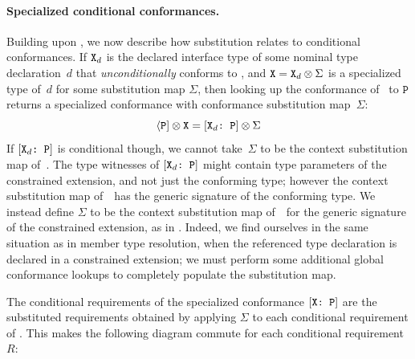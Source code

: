 \documentclass[../generics]{subfiles}
\begin{document}
\paragraph{Specialized conditional conformances.} Building upon , we now describe how substitution relates to conditional conformances. If $\texttt{X}_d$ is the declared interface type of some nominal type declaration~$d$ that \emph{unconditionally} conforms to \tP, and $\texttt{X} = \texttt{X}_d \otimes \Sigma$ is a specialized type of~$d$ for some substitution map $\Sigma$, then looking up the conformance of \tX\ to $\texttt{P}$ returns a specialized conformance with conformance substitution map~$\Sigma$:
\[\langle\texttt{P}]\otimes\texttt{X}=[\texttt{$\texttt{X}_d$:~P}]\otimes\Sigma\]
If $[\texttt{$\texttt{X}_d$:~P}]$ is conditional though, we cannot take~$\Sigma$ to be the context substitution map of~\tX. The type witnesses of $[\texttt{$\texttt{X}_d$:~P}]$ might contain type parameters of the constrained extension, and not just the conforming type; however the context substitution map of~\tX\ has the generic signature of the conforming type. We instead define $\Sigma$ to be the context substitution map of~\tX\ for the generic signature of the constrained extension, as in . Indeed, we find ourselves in the same situation as in member type resolution, when the referenced type declaration is declared in a constrained extension; we must perform some additional global conformance lookups to completely populate the substitution map.

The conditional requirements of the specialized conformance $[\texttt{X:~P}]$ are the substituted requirements obtained by applying $\Sigma$ to each conditional requirement of . This makes the following diagram commute for each conditional requirement~$R$:
\begin{center}
\newcommand{\GetConditionalRequirements}{\def\arraystretch{0.65}\arraycolsep=0pt\begin{array}{c}\text{get conditional}\\\text{requirement}\end{array}}
\end{center}
\end{document}
